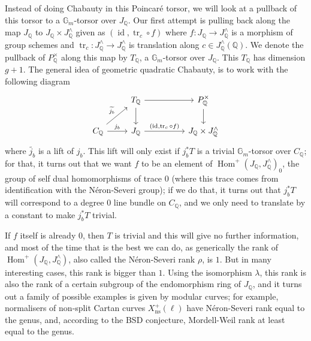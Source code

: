 \documentclass[12pt]{article}
\renewcommand{\G}{\mathbb{G}}
\newcommand{\Q}{\mathbb{Q}}
\DeclareMathOperator{\Hom}{Hom}
\DeclareMathOperator{\id}{id}
\DeclareMathOperator{\tr}{tr}
\theoremstyle{plain}
\theoremstyle{definition}
\theoremstyle{remark}
\begin{document}
Instead of doing Chabauty in this Poincar\'e torsor, we will look at a pullback of this torsor to a $\G_m$-torsor over $J_\Q$. Our first attempt is pulling back along the map $J_\Q$ to $J_\Q \times J^\wedge_\Q$ given as $(\id,\tr_c \circ f)$ where $f: J_\Q \to J^\wedge_\Q$ is a morphism of group schemes and $\tr_c: J^\wedge_\Q \to J^\wedge_\Q$ is translation along $c \in J^\wedge_\Q(\Q)$. We denote the pullback of $P^\times_\Q$ along this map by $T_\Q$, a $\G_m$-torsor over $J_\Q$. This $T_\Q$ has dimension $g+1$. The general idea of geometric quadratic Chabauty, is to work with the following diagram
\[\begin{tikzcd} %
                                                & T_\Q \arrow[d] \arrow[rr]                   && P_\Q^\times \arrow[d]      \\
C_\Q \arrow[ru, "\widetilde{j_b}"] \arrow[r, "j_b"] & J_\Q \arrow[rr, "{(\id,\tr_c \circ f)}"] && J_\Q \times J^\wedge_\Q
\end{tikzcd}\]
where $\widetilde{j_b}$ is a lift of $j_b$. This lift will only exist if $j_b^* T$ is a trivial $\G_m$-torsor over $C_\Q$; for that, it turns out that we want $f$ to be an element of $\Hom^+(J_\Q,J^\wedge_\Q)_0$, the group of self dual homomorphisms of trace $0$ (where this trace comes from identification with the N\'eron-Severi group); if we do that, it turns out that $j_b^* T$ will correspond to a degree $0$ line bundle on $C_\Q$, and we only need to translate by a constant to make $j_b^* T$ trivial.

If $f$ itself is already $0$, then $T$ is trivial and this will give no further information, and most of the time that is the best we can do, as generically the rank of $\Hom^+(J_\Q,J^\wedge_\Q)$, also called the N\'eron-Severi rank $\rho$, is $1$. But in many interesting cases, this rank is bigger than $1$. Using the isomorphism $\lambda$, this rank is also the rank of a certain subgroup of the endomorphism ring of $J_\Q$, and it turns out a family of possible examples is given by modular curves; for example, normalisers of non-split Cartan curves $X_{\text{ns}}^+(\ell)$ have N\'eron-Severi rank equal to the genus, and, according to the BSD conjecture, Mordell-Weil rank at least equal to the genus.
\end{document}
